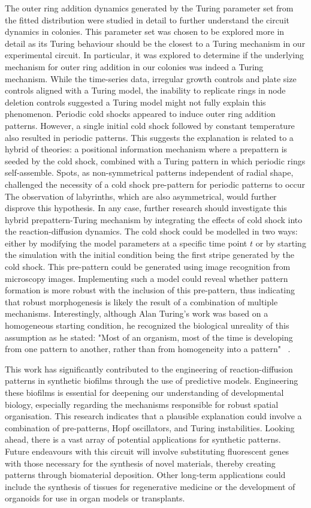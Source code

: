 The outer ring addition dynamics generated by the Turing parameter set from the fitted distribution were studied in detail to further understand the circuit dynamics in colonies.
This parameter set was chosen to be explored more in detail as its Turing behaviour should be the closest to a Turing mechanism in our experimental circuit.
In particular, it was explored to determine if the underlying mechanism for outer ring addition in our colonies was indeed a Turing mechanism.
While the time-series data, irregular growth controls and plate size controls aligned with a Turing model, the inability to replicate rings in node deletion controls suggested a Turing model might not fully explain this phenomenon.
Periodic cold shocks appeared to induce outer ring addition patterns.
However, a single initial cold shock followed by constant temperature also resulted in periodic patterns.
This suggests the explanation is related to a hybrid of theories: a positional information mechanism where a prepattern is seeded by the cold shock, combined with a Turing pattern in which periodic rings self-assemble.
Spots, as non-symmetrical patterns independent of radial shape, challenged the necessity of a cold shock pre-pattern for periodic patterns to occur
The observation of labyrinths, which are also asymmetrical, would further disprove this hypothesis.
In any case, further research should investigate this hybrid prepattern-Turing mechanism by integrating the effects of cold shock into the reaction-diffusion dynamics.
The cold shock could be modelled in two ways: either by modifying the model parameters at a specific time point $t$ or by starting the simulation with the initial condition being the first stripe generated by the cold shock.
This pre-pattern could be generated using image recognition from microscopy images.
Implementing such a model could reveal whether pattern formation is more robust with the inclusion of this pre-pattern, thus indicating that robust morphogenesis is likely the result of a combination of multiple mechanisms.
Interestingly, although Alan Turing's work was based on a homogeneous starting condition, he recognized the biological unreality of this assumption as he stated: "Most of an organism, most of the time is developing from one pattern to another, rather than from homogeneity into a pattern" ~\parencite{Turing1952}.


This work has significantly contributed to the engineering of reaction-diffusion patterns in synthetic biofilms through the use of predictive models.
Engineering these biofilms is essential for deepening our understanding of developmental biology, especially regarding the mechanisms responsible for robust spatial organisation.
This research indicates that a plausible explanation could involve a combination of pre-patterns, Hopf oscillators, and Turing instabilities.
Looking ahead, there is a vast array of potential applications for synthetic patterns.
Future endeavours with this circuit will involve substituting fluorescent genes with those necessary for the synthesis of novel materials, thereby creating patterns through biomaterial deposition.
Other long-term applications could include the synthesis of tissues for regenerative medicine or the development of organoids for use in organ models or transplants.
